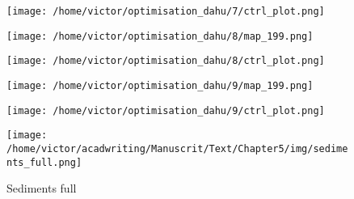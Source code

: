\documentclass[../../Main_ManuscritThese.tex]{subfiles}
\begin{document}
\begin{figure}[ht]
  \centering
  \texttt{[image: /home/victor/optimisation\_dahu/7/ctrl\_plot.png]}
\end{figure}
\clearpage
\begin{figure}[ht]
  \centering
  \texttt{[image: /home/victor/optimisation\_dahu/8/map\_199.png]}
\end{figure}
\begin{figure}[ht]
  \centering
  \texttt{[image: /home/victor/optimisation\_dahu/8/ctrl\_plot.png]}
\end{figure}
\clearpage
\begin{figure}[ht]
  \centering
  \texttt{[image: /home/victor/optimisation\_dahu/9/map\_199.png]}
\end{figure}
\begin{figure}[ht]
  \centering
  \texttt{[image: /home/victor/optimisation\_dahu/9/ctrl\_plot.png]}
\end{figure}
\clearpage

\begin{figure}[ht]
  \centering
  \texttt{[image: /home/victor/acadwriting/Manuscrit/Text/Chapter5/img/sediments\_full.png]}
  \caption{\label{fig:sediments_full} Sediments full}
\end{figure}



\pagestyle{appendixStyle}



\subfileLocal{
	\pagestyle{empty}
	
	

}

\end{document}
